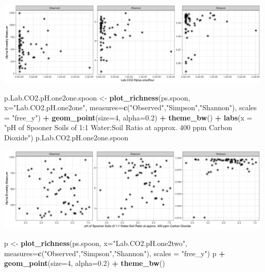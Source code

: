 \documentclass[]{article}
\newenvironment{Shaded}{\begin{snugshade}}{\end{snugshade}}
\newcommand{\DataTypeTok}[1]{\textcolor[rgb]{0.13,0.29,0.53}{#1}}
\newcommand{\DecValTok}[1]{\textcolor[rgb]{0.00,0.00,0.81}{#1}}
\newcommand{\FloatTok}[1]{\textcolor[rgb]{0.00,0.00,0.81}{#1}}
\newcommand{\KeywordTok}[1]{\textcolor[rgb]{0.13,0.29,0.53}{\textbf{#1}}}
\newcommand{\NormalTok}[1]{#1}
\newcommand{\OperatorTok}[1]{\textcolor[rgb]{0.81,0.36,0.00}{\textbf{#1}}}
\newcommand{\StringTok}[1]{\textcolor[rgb]{0.31,0.60,0.02}{#1}}
\begin{document}
\includegraphics{output-rmd/richness-ph-Lab.CO2.Hplus.one2four.wisc-1.png}

\begin{Shaded}
\begin{Highlighting}[]
\NormalTok{p.Lab.CO2.pH.one2one.spoon <-}\StringTok{ }\KeywordTok{plot_richness}\NormalTok{(ps.spoon, }\DataTypeTok{x=}\StringTok{"Lab.CO2.pH.one2one"}\NormalTok{, }\DataTypeTok{measures=}\KeywordTok{c}\NormalTok{(}\StringTok{"Observed"}\NormalTok{,}\StringTok{"Simpson"}\NormalTok{,}\StringTok{"Shannon"}\NormalTok{), }\DataTypeTok{scales =} \StringTok{"free_y"}\NormalTok{) }\OperatorTok{+}\StringTok{ }\KeywordTok{geom_point}\NormalTok{(}\DataTypeTok{size=}\DecValTok{4}\NormalTok{, }\DataTypeTok{alpha=}\FloatTok{0.2}\NormalTok{) }\OperatorTok{+}\StringTok{ }\KeywordTok{theme_bw}\NormalTok{() }\OperatorTok{+}\StringTok{ }\KeywordTok{labs}\NormalTok{(}\DataTypeTok{x =} \StringTok{"pH of Spooner Soils of 1:1 Water:Soil Ratio at approx. 400 ppm Carbon Dioxide"}\NormalTok{)}
\NormalTok{p.Lab.CO2.pH.one2one.spoon}
\end{Highlighting}
\end{Shaded}

\includegraphics{output-rmd/richness-ph-Lab.CO2.pH.one2one.spoon-1.png}

\begin{Shaded}
\begin{Highlighting}[]
\NormalTok{p <-}\StringTok{ }\KeywordTok{plot_richness}\NormalTok{(ps.spoon, }\DataTypeTok{x=}\StringTok{"Lab.CO2.pH.one2two"}\NormalTok{, }\DataTypeTok{measures=}\KeywordTok{c}\NormalTok{(}\StringTok{"Observed"}\NormalTok{,}\StringTok{"Simpson"}\NormalTok{,}\StringTok{"Shannon"}\NormalTok{), }\DataTypeTok{scales =} \StringTok{"free_y"}\NormalTok{)}
\NormalTok{p }\OperatorTok{+}\StringTok{ }\KeywordTok{geom_point}\NormalTok{(}\DataTypeTok{size=}\DecValTok{4}\NormalTok{, }\DataTypeTok{alpha=}\FloatTok{0.2}\NormalTok{) }\OperatorTok{+}\StringTok{ }\KeywordTok{theme_bw}\NormalTok{()}
\end{Highlighting}
\end{Shaded}
\end{document}
